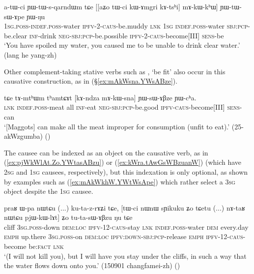  \begin{exe}
\ex  \label{ex:mAkWkhW.YWtWsApe}
\gll a-tɯ-ci ɲɯ-tɯ-s-qarndɯm tɕe [[aʑo tɯ-ci kɯ-ɤmgri kɤ-tsʰi] mɤ-kɯ-kʰɯ] ɲɯ-tɯ-sɯ-ɤpe ɲɯ-ŋu  \\
\textsc{1sg}.\textsc{poss}-\textsc{indef}.\textsc{poss}-water \textsc{ipfv}-\textsc{2}-\textsc{caus}-be.muddy \textsc{lnk} \textsc{1sg} \textsc{indef}.\textsc{poss}-water \textsc{sbj}:\textsc{pcp}-be.clear \textsc{inf}-drink \textsc{neg}-\textsc{sbj}:\textsc{pcp}-be.possible \textsc{ipfv}-2-\textsc{caus}-become[III] \textsc{sens}-be \\
\glt `You have spoiled my water, you caused me to be unable to drink clear water.' (lang he yang-zh)
\end{exe}

Other complement-taking stative verbs such as , `be fit' also occur in this causative construction, as in (§\ref{ex:mAkWsna.YWsABze}).

 \begin{exe}
\ex  \label{ex:mAkWsna.YWsABze}
\gll tɕe tɤ-mtʰɯm tʰamtɕɤt [kɤ-ndza mɤ-kɯ-sna] ɲɯ-sɯ-ɤβze ɲɯ-cʰa. \\
\textsc{lnk} \textsc{indef}.\textsc{poss}-meat all \textsc{inf}-eat \textsc{neg}-\textsc{sbj}:\textsc{pcp}-be.good \textsc{ipfv}-\textsc{caus}-become[III] \textsc{sens}-can \\
\glt `[Maggots] can make all the meat improper for consumption (unfit to eat).' (25-akWzgumba)
()
\end{exe}

The causee can be indexed as an object on the causative verb, as in (\ref{ex:pjWkWlAt.Zo.YWtasABzu}) or (\ref{ex:kWra.tAwGsWBzuanW}) (which have \textsc{2sg} and \textsc{1sg} causees, respectively), but this indexation is only optional, as shown by examples such as (\ref{ex:mAkWkhW.YWtWsApe}) which rather select a \textsc{3sg} object despite the \textsc{1sg} causee.

 \begin{exe}
\ex  \label{ex:pjWkWlAt.Zo.YWtasABzu}
\gll praʁ ɯ-pa nɯtɕu (...) ku-ta-z-rɤʑi tɕe, [tɯ-ci nɯnɯ sɲikuku ʑo tɕetu (...) nɤ-taʁ nɯtɕu pjɯ-kɯ-lɤt] ʑo tu-ta-sɯ-ɤβzu ŋu tɕe \\
cliff \textsc{3sg}.\textsc{poss}-down \textsc{dem}:\textsc{loc} { } \textsc{ipfv}-1\fl{}2-\textsc{caus}-stay \textsc{lnk} \textsc{indef}.\textsc{poss}-water \textsc{dem} every.day \textsc{emph} up.there { } \textsc{3sg}.\textsc{poss}-on \textsc{dem}:\textsc{loc} \textsc{ipfv}:\textsc{down}-\textsc{sbj}:\textsc{pcp}-release \textsc{emph} \textsc{ipfv}-1\fl{}2-\textsc{caus}-become be:\textsc{fact} \textsc{lnk} \\
\glt `(I will not kill you), but I will have you stay under the cliffs, in such a way that the water flows down onto you.' (150901 changfamei-zh)
()
\end{exe}

